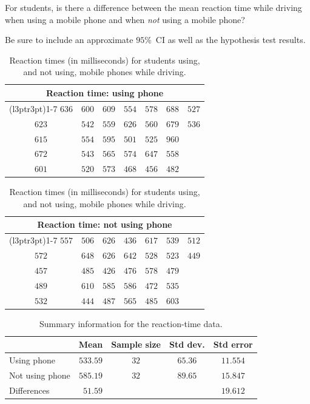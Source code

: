 \documentclass[
  11pt,
  a4paper,
  krantz2]{krantz}
\makeatletter
\renewenvironment{quote}%
{\begin{kframe}}
{\end{kframe}}
\newenvironment{kframe}{%
\medskip{}
\setlength{\fboxsep}{.8em}
 \def\at@end@of@kframe{}%
 \ifinner\ifhmode%
  \def\at@end@of@kframe{\end{minipage}}%
  \begin{minipage}{\columnwidth}%
 \fi\fi%
 \def\FrameCommand##1{\hskip\@totalleftmargin \hskip-\fboxsep
 \colorbox{shadecolor}{##1}\hskip-\fboxsep
     \hskip-\linewidth \hskip-\@totalleftmargin \hskip\columnwidth}%
 \MakeFramed {\advance\hsize-\width
   \@totalleftmargin\z@ \linewidth\hsize
   \@setminipage}}%
 {\par\unskip\endMakeFramed%
 \at@end@of@kframe}
\renewenvironment{quote}
               {\list{}{\vspace{-0.5em}\begin{kframe}\small%
                        \rightmargin   \leftmargin
                        \parsep        \z@ \@plus\p@}%
                \item\relax}
               {\end{kframe}\endlist}
\makeatother
\begin{document}
\begin{quote}
For students, is there a difference between the mean reaction time while driving when using a mobile phone and when \emph{not} using a mobile phone?
\end{quote}

Be sure to include an approximate \(95\)\%~CI as well as the hypothesis test results.

\begin{table} \centering \centering\caption{\label{tab:PhoneDataTable}Reaction times (in milliseconds) for students using, and not using, mobile phones while driving.}

\fontsize{10}{12}\selectfont
\begin{tabular}[t]{ccccccc}
\toprule
\multicolumn{7}{c}{\textbf{Reaction time: using phone}} \\
\cmidrule(l{3pt}r{3pt}){1-7}
$636$ & $600$ & $609$ & $554$ & $578$ & $688$ & $527$\\
$623$ & $542$ & $559$ & $626$ & $560$ & $679$ & $536$\\
$615$ & $554$ & $595$ & $501$ & $525$ & $960$ & \\
$672$ & $543$ & $565$ & $574$ & $647$ & $558$ & \\
$601$ & $520$ & $573$ & $468$ & $456$ & $482$ & \\
\bottomrule
\end{tabular} \quad\quad 
\begin{tabular}[t]{ccccccc}
\toprule
\multicolumn{7}{c}{\textbf{Reaction time: not using phone}} \\
\cmidrule(l{3pt}r{3pt}){1-7}
$557$ & $506$ & $626$ & $436$ & $617$ & $539$ & $512$\\
$572$ & $648$ & $626$ & $642$ & $528$ & $523$ & $449$\\
$457$ & $485$ & $426$ & $476$ & $578$ & $479$ & \\
$489$ & $610$ & $585$ & $586$ & $472$ & $535$ & \\
$532$ & $444$ & $487$ & $565$ & $485$ & $603$ & \\
\bottomrule
\end{tabular}
\end{table}

\begin{table}

\caption{\label{tab:PhoneSummary}Summary information for the reaction-time data.}
\centering
\begin{tabular}[t]{lcccc}
\toprule
\textbf{ } & \textbf{Mean} & \textbf{Sample size} & \textbf{Std dev.} & \textbf{Std error}\\
\midrule
Using phone & $533.59$ & $32$ & $65.36$ & $11.554$\\
Not using phone & $585.19$ & $32$ & $89.65$ & $15.847$\\
\midrule
Differences & $\phantom{0}51.59$ &  &  & $19.612$\\
\bottomrule
\end{tabular}
\end{table}
\end{document}
